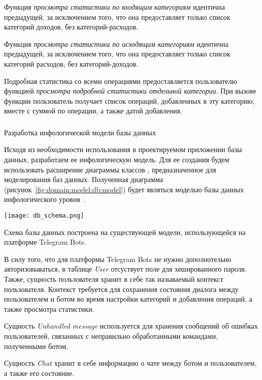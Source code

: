 Функция \emph{просмотра статистики по входящим категориям} идентична предыдущей, за исключением того, что она предоставляет только список категорий доходов, без категорий-расходов.

Функция \emph{просмотра статистики по исходящим категориям} идентична предыдущей, за исключением того, что она предоставляет только список категорий расходов, без категорий-доходов.

Подробная статистика со всеми операциями предоставляется пользователю функцией \emph{просмотра подробной статистики отдельной категории}. При вызове функции пользователь получает список операций, добавленных в эту категорию, вместе с суммой по операции, а также датой добавления.

\subsubsection{} Разработка инфологической модели базы данных
\label{sec:domain:model:db}

Исходя из необходимости использования в проектируемом приложении базы данных, разработаем ее инфологическую модель. Для ее создания будем использовать расширение диаграммы классов \uml, предназначенное для моделирования баз данных. Полученная диаграмма (рисунок~\ref{fig:domain:model:db:model}) будет являться моделью базы данных инфологического уровня~\cite{kulikov_db_workbook}.

\begin{sidewaysfigure}
\centering
	\texttt{[image: db\_schema.png]}
	\caption{Инфологическая модель базы данных}
	\label{fig:domain:model:db:model}
\end{sidewaysfigure}

Схема базы данных построена на существующей модели, использующейся на платформе Telegram Bots.

В силу того, что для платформы Telegram Bots не нужно дополнотельно авторизовываться, в таблице \emph{User} отсуствует поле для хешированного пароля. Также, сущность пользователя хранит в себе так называемый контекст пользователя. Контекст требуется для сохранения состояния диалога между пользователем и ботом во время настройки категорий и добавления операций, а также просмотра статистики.

Сущность \emph{Unhandled message} используется для хранения сообщений об ошибках пользователей, связанных с неправильно обработанными командами, полученными ботом.

Сущность \emph{Chat} хранит в себе информацию о чате между ботом и пользователем, а также его состояние.

